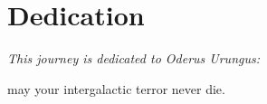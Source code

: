 
\chapter{Dedication}

{\LARGE \it
\hfill This journey is dedicated to Oderus Urungus:

\hfill may your intergalactic terror never die. 
}

